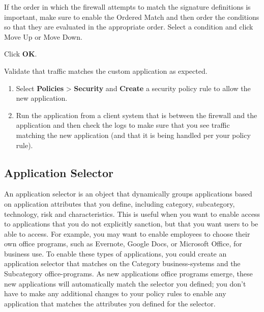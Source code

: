 \begin{description}
\begin{enumerate}
            If the order in which the firewall attempts to match the signature definitions is important, make sure to enable the Ordered Match and then order the conditions so that they are evaluated in the appropriate order. Select a condition and click Move Up or Move Down.
    \end{enumerate}
    \item[STEP 4.]	Click \textbf{OK}.
    \item[STEP 5.]	Validate that traffic matches the custom application as expected.
    \begin{enumerate}
        \item Select \textbf{Policies} > \textbf{Security} and \textbf{Create} a security policy rule to allow the new application.
        \item Run the application from a client system that is between the firewall and the application and then check the logs to make sure that you see traffic matching the new application (and that it is being handled per your policy rule).
    \end{enumerate}
\end{description}

\subsection*{\hypertarget{link:Application Selector}{Application Selector}}
\label{sec:objects:application:selector}

An application selector is an object that dynamically groups applications based on application attributes that you define, including category, subcategory, technology, risk and characteristics. This is useful when you want to enable access to applications that you do not explicitly sanction, but that you want users to be able to access. For example, you may want to enable employees to choose their own office programs, such as Evernote, Google Docs, or Microsoft Office, for business use. To enable these types of applications, you could create an application selector that matches on the Category business-systems and the Subcategory office-programs. As new applications office programs emerge, these new applications will automatically match the selector you defined; you don’t have to make any additional changes to your policy rules to enable any application that matches the attributes you defined for the selector.

